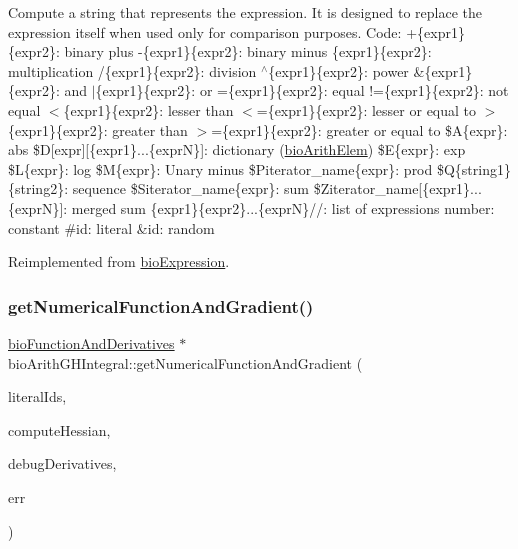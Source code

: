 Compute a string that represents the expression. It is designed to replace the expression itself when used only for comparison purposes. Code\+: +\{expr1\}\{expr2\}\+: binary plus -\/\{expr1\}\{expr2\}\+: binary minus \{expr1\}\{expr2\}\+: multiplication /\{expr1\}\{expr2\}\+: division $^\wedge$\{expr1\}\{expr2\}\+: power \&\{expr1\}\{expr2\}\+: and $\vert$\{expr1\}\{expr2\}\+: or =\{expr1\}\{expr2\}\+: equal !=\{expr1\}\{expr2\}\+: not equal $<$\{expr1\}\{expr2\}\+: lesser than $<$=\{expr1\}\{expr2\}\+: lesser or equal to $>$\{expr1\}\{expr2\}\+: greater than $>$=\{expr1\}\{expr2\}\+: greater or equal to \$A\{expr\}\+: abs \$D\mbox{[}expr\mbox{]}\mbox{[}\{expr1\}...\{exprN\}\mbox{]}\+: dictionary (\hyperlink{classbio_arith_elem}{bio\+Arith\+Elem}) \$E\{expr\}\+: exp \$L\{expr\}\+: log \$M\{expr\}\+: Unary minus \$\+Piterator\+\_\+name\{expr\}\+: prod \$Q\{string1\}\{string2\}\+: sequence \$\+Siterator\+\_\+name\{expr\}\+: sum \$\+Ziterator\+\_\+name\mbox{[}\{expr1\}...\{exprN\}\mbox{]}\+: merged sum \{expr1\}\{expr2\}...\{exprN\}//\+: list of expressions number\+: constant \#id\+: literal \&id\+: random 

Reimplemented from \hyperlink{classbio_expression_a3e4b4dca58dbbc6f0e411b30eb3f60b4}{bio\+Expression}.

\mbox{\label{classbio_arith_g_h_integral_a2148674c32e7bea35d7e6ef275c2f7f5}} 
\subsubsection{\texorpdfstring{get\+Numerical\+Function\+And\+Gradient()}{getNumericalFunctionAndGradient()}}
{\footnotesize\ttfamily \hyperlink{classbio_function_and_derivatives}{bio\+Function\+And\+Derivatives} $\ast$ bio\+Arith\+G\+H\+Integral\+::get\+Numerical\+Function\+And\+Gradient (\begin{DoxyParamCaption}\item[{vector$<$ pat\+U\+Long $>$}]{literal\+Ids,  }\item[{pat\+Boolean}]{compute\+Hessian,  }\item[{pat\+Boolean}]{debug\+Derivatives,  }\item[{pat\+Error $\ast$\&}]{err }\end{DoxyParamCaption})\hspace{0.3cm}{\ttfamily [virtual]}}

